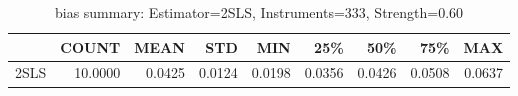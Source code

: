 \begin{table}[ht]
\centering
\caption{bias summary: Estimator=2SLS, Instruments=333, Strength=0.60}
\begin{tabular}{lrrrrrrrr}
\toprule
 & COUNT & MEAN & STD & MIN & 25\% & 50\% & 75\% & MAX \\
\midrule
2SLS & 10.0000 & 0.0425 & 0.0124 & 0.0198 & 0.0356 & 0.0426 & 0.0508 & 0.0637 \\
\bottomrule
\end{tabular}
\end{table}
